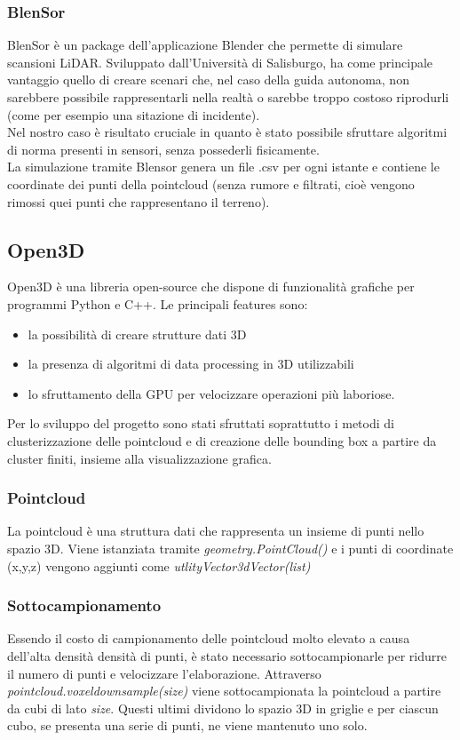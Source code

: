 \documentclass[italian]{article}
\begin{document}
\subsubsection{BlenSor}
BlenSor è un package dell'applicazione Blender che permette di simulare scansioni LiDAR. Sviluppato dall'Università di Salisburgo, ha come principale vantaggio quello di creare scenari che, nel caso della guida autonoma, non sarebbere possibile rappresentarli nella realtà o sarebbe troppo costoso riprodurli (come per esempio una sitazione di incidente).\\
Nel nostro caso è risultato cruciale in quanto è stato possibile sfruttare algoritmi di norma presenti in sensori, senza possederli fisicamente.\\
La simulazione tramite Blensor genera un file .csv per ogni istante e contiene le coordinate dei punti della pointcloud (senza rumore e filtrati, cioè vengono rimossi quei punti che rappresentano il terreno).
\subsection{Open3D}
Open3D è una libreria open-source che dispone di funzionalità grafiche per programmi Python e C++. Le principali features sono:
\begin{itemize}
	\item la possibilità di creare strutture dati 3D
	\item la presenza di algoritmi di data processing in 3D utilizzabili 
	\item lo sfruttamento della GPU per velocizzare operazioni più laboriose.
\end{itemize}
Per lo sviluppo del progetto sono stati sfruttati soprattutto i metodi di clusterizzazione delle pointcloud e di creazione delle bounding box a partire da cluster finiti, insieme alla visualizzazione grafica.
\subsubsection{Pointcloud}
La pointcloud è una struttura dati che rappresenta un insieme di punti nello spazio 3D. Viene istanziata tramite \textit{geometry.PointCloud()} e i punti di coordinate (x,y,z) vengono aggiunti come \textit{utlityVector3dVector(list)}\\
\subsubsection*{Sottocampionamento}
Essendo il costo di campionamento delle pointcloud molto elevato a causa dell'alta densità densità di punti, è stato necessario sottocampionarle per ridurre il numero di punti e velocizzare l'elaborazione. Attraverso \textit{pointcloud.voxeldownsample(size)}  viene sottocampionata la pointcloud a partire da cubi di lato \textit{size}. Questi ultimi dividono lo spazio 3D in griglie e per ciascun cubo, se presenta una serie di punti, ne viene mantenuto uno solo.
\end{document}

